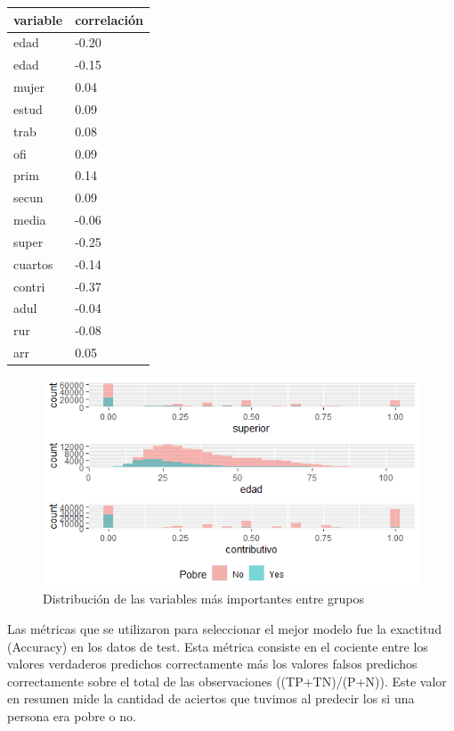\documentclass[
  11pt,
  letterpaper,
]{article}
\begin{document}
\begin{longtable}[]{@{}ll@{}}
\toprule\noalign{}
variable & correlación \\
\midrule\noalign{}
\endhead
\bottomrule\noalign{}
\endlastfoot
edad & -0.20 \\
edad & -0.15 \\
mujer & 0.04 \\
estud & 0.09 \\
trab & 0.08 \\
ofi & 0.09 \\
prim & 0.14 \\
secun & 0.09 \\
media & -0.06 \\
super & -0.25 \\
cuartos & -0.14 \\
contri & -0.37 \\
adul & -0.04 \\
rur & -0.08 \\
arr & 0.05 \\
\end{longtable}

\begin{figure}[H]

{\centering \includegraphics[width=7.51in]{../views/importancia_modelo} 

}

\caption{Distribución de las variables más importantes entre grupos}\label{fig:include}
\end{figure}

Las métricas que se utilizaron para seleccionar el mejor modelo fue la exactitud (Accuracy) en los datos de test. Esta métrica consiste en el cociente entre los valores verdaderos predichos correctamente más los valores falsos predichos correctamente sobre el total de las observaciones ((TP+TN)/(P+N)). Este valor en resumen mide la cantidad de aciertos que tuvimos al predecir los si una persona era pobre o no.
\end{document}
